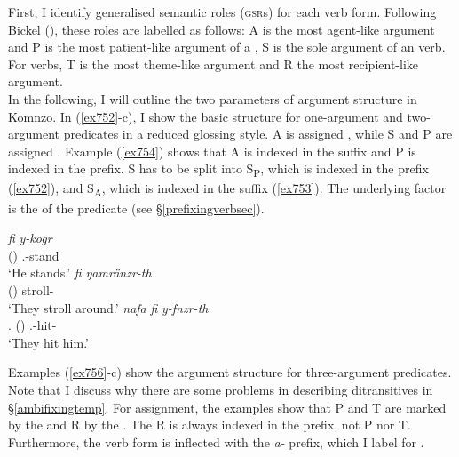 First, I identify generalised semantic roles (\textsc{gsr}s) for each verb form. Following Bickel (\citeyear{Bickel:2011wo}), these roles are labelled as follows: A is the most agent-like argument and P is the most patient-like argument of a  , S is the sole argument of an  verb. For  verbs, T is the most theme-like argument and R the most recipient-like argument.\\

In the following, I will outline the two parameters of argument structure in Komnzo. In (\ref{ex752}-c), I show the basic structure for one-argument and two-argument predicates in a reduced glossing style. A is assigned  , while S and P are assigned  . Example (\ref{ex754}) shows that A is indexed in the suffix and P is indexed in the prefix. S has to be split into S\textsubscript{P}, which is indexed in the prefix (\ref{ex752}), and S\textsubscript{A}, which is indexed in the suffix (\ref{ex753}). The underlying factor is the  of the predicate (see \S\ref{prefixingverbsec}).

\begin{exe}
\ex
\label{ex751}
\begin{xlist}
	\ex %
	\gll \emph{fi} \emph{y-kogr}\\
	\Third(\Abs) \Tsg.\Masc-stand\\
	\trans `He stands.'
	\label{ex752}
	\ex %
	\gll \emph{fi} \emph{ŋamränzr-th}\\
	\Third(\Abs) stroll-\Tpl\\
	\trans `They stroll around.'
	\label{ex753}
	\ex %
	\gll \emph{nafa} \emph{fi} \emph{y-fnzr-th}\\
	\Tpl{}.\Erg{} \Third(\Abs) \Tsg.\Masc-hit-\Tpl{}\\
	\trans `They hit him.'
	\label{ex754}
\end{xlist}
\end{exe}

Examples (\ref{ex756}-c) show the argument structure for three-argument predicates. Note that I discuss why there are some problems in describing ditransitives in \S\ref{ambifixingtemp}. For  assignment, the examples show that P and T are marked by the   and R by the  . The R is always indexed in the prefix, not P nor T. Furthermore, the verb form is inflected with the \emph{a-} prefix, which I label \Vc{} for .

